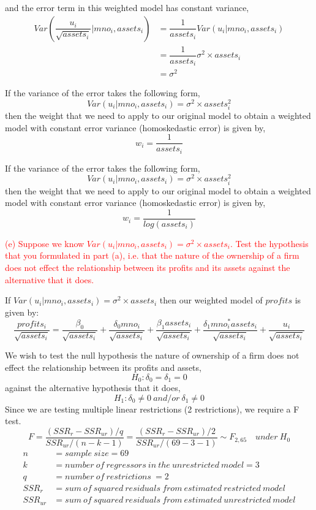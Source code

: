 \documentclass[12pt]{report}
\begin{document}
\noindent and the error term in this weighted model has constant variance,
\begin{align*}
Var(\dfrac{u_i}{\sqrt{assets_i}}|mno_i,assets_i) &= \dfrac{1}{assets_i}Var(u_i|mno_i,assets_i) \\
&= \dfrac{1}{assets_i}\sigma^2 \times assets_i \\
&= \sigma^2
\end{align*}

\noindent If the variance of the error takes the following form,
$$Var(u_i|mno_i, assets_i) = \sigma^2 \times assets_i^2$$
\noindent then the weight that we need to apply to our original model to obtain a weighted model with constant error variance (homoskedastic error) is given by,
$$w_i = \dfrac{1}{assets_i}$$

\noindent If the variance of the error takes the following form,
$$Var(u_i|mno_i, assets_i) = \sigma^2 \times assets_i^2$$
\noindent then the weight that we need to apply to our original model to obtain a weighted model with constant error variance (homoskedastic error) is given by,
$$w_i = \dfrac{1}{log(assets_i)}$$

\newpage
\noindent \textcolor{red}
{
	(e) Suppose we know $Var(u_i|mno_i,assets_i) = \sigma^2 \times assets_i$. Test the hypothesis that you formulated in part (a), i.e. that the nature of the ownership of a firm does not effect the relationship between its profits and its assets against the alternative that it does.
}

\noindent If $Var(u_i|mno_i,assets_i) = \sigma^2 \times assets_i$ then our weighted model of $profits$ is given by: $$\dfrac{profits_i}{\sqrt{assets_i}} = \dfrac{\beta_0}{\sqrt{assets_i}} + \dfrac{\delta_0mno_i}{\sqrt{assets_i}} + \dfrac{\beta_1assets_i}{\sqrt{assets_i}} + \dfrac{\delta_1mno_i^*assets_i}{\sqrt{assets_i}} + \dfrac{u_i}{\sqrt{assets_i}}$$

\noindent We wish to test the null hypothesis the nature of ownership of a firm does not effect the relationship between its profits and assets, $$H_0: \delta_0 = \delta_1 = 0$$ against the alternative hypothesis that it does, $$H_1:\delta_0 \neq 0\ and/or\ \delta_1 \neq 0$$ Since we are testing multiple linear restrictions (2 restrictions), we require a F test. $$F = \dfrac{(SSR_r - SSR_{ur})/q}{SSR_{ur}/(n-k-1)} = \dfrac{(SSR_r - SSR_{ur})/2}{SSR_{ur}/(69-3-1)} \sim F_{2,65} \quad under\ H_0$$
\begin{align*}
n &= sample\ size = 69 \\
k &= number\ of\ regressors\ in\ the\ unrestricted\ model = 3 \\
q &= number\ of\ restrictions\ = 2 \\
SSR_{r} &= sum\ of\ squared\ residuals\ from\ estimated\ restricted\ model \\
SSR_{ur} &= sum\ of\ squared\ residuals\ from\ estimated\ unrestricted\ model
\end{align*}
\end{document}
